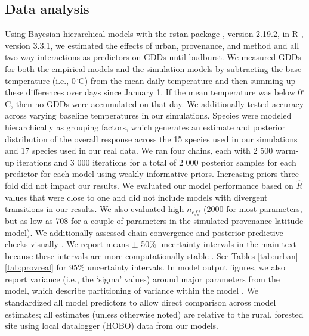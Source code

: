 \documentclass{article}\usepackage[]{graphicx}\usepackage[]{color}
\begin{document}
\subsection*{Data analysis}
Using Bayesian hierarchical models with the rstan package \citep{rstan2019}, version 2.19.2,  in R \citep{R}, version 3.3.1, we estimated the effects of urban, provenance, and method and all two-way interactions as predictors on GDDs until budburst. We measured GDDs for both the empirical models and the simulation models by subtracting the base temperature (i.e., 0$^{\circ}$C) from the mean daily temperature and then summing up these differences over days \citep{Asse2018} since January 1. If the mean temperature was below 0$^{\circ}$C, then no GDDs were accumulated on that day. We additionally tested accuracy across varying baseline temperatures in our simulations. Species were modeled hierarchically as grouping factors, which generates an estimate and posterior distribution of the overall response across the 15 species used in our simulations and 17 species used in our real data. We ran four chains, each with 2 500 warm-up iterations and 3 000 iterations for a total of 2 000 posterior samples for each predictor for each model using weakly informative priors. Increasing priors three-fold did not impact our results. We evaluated our model performance based on $\hat{R}$ values that were close to one and did not include models with divergent transitions in our results. We also evaluated high $n_{eff}$ (2000 for most parameters, but as low as 708 for a couple of parameters in the simulated provenance latitude model). We additionally assessed chain convergence and posterior predictive checks visually \citep{BDA}. We report means $\pm$ 50\% uncertainty intervals in the main text because these intervals are more computationally stable \citep{BDA,Carpenter2017}. See Tables \ref{tab:urban}-\ref{tab:provreal} for 95\% uncertainty intervals. In model output figures, we also report variance (i.e., the `sigma' values) around major parameters from the model, which describe partitioning of variance within the model \citep{BDA}. We standardized all model predictors to allow direct comparison across model estimates; all estimates (unless otherwise noted) are relative to the rural, forested site using local datalogger (HOBO) data from our models. 
\end{document}
